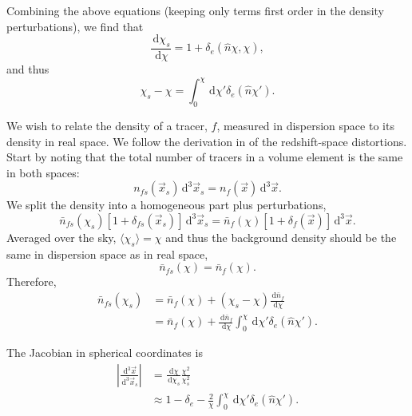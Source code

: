 \documentclass[twocolumn,prl,floatfix]{revtex4-1}
\newcommand{\ud}{\,\mathrm{d}}
\begin{document}
Combining the above equations (keeping only terms first order in the density
perturbations), we find that
\begin{equation}
\frac{\ud \chi_s}{\ud \chi} = 1 + \delta_e(\hat n \chi, \chi),
\end{equation}
and thus
\begin{equation}
\chi_s - \chi = \int_0^\chi \ud \chi' \delta_e(\hat n \chi').
\end{equation}

We wish to relate the density of a tracer, $f$, measured in dispersion space to its
density in real space. We follow the derivation in \citet{1987MNRAS.227....1K}
of the
redshift-space distortions. Start by noting that the total number of tracers
in a volume element is the same in both spaces:
\begin{equation}
n_{fs}(\vec x_s) \ud^3\vec x_s = n_{f}(\vec x) \ud^3\vec x.
\end{equation}
We split the density into a homogeneous part plus perturbations,
\begin{equation}
\label{e:density}
    \bar{n}_{fs}(\chi_s)\left[ 1 + \delta_{fs}(\vec x_s)\right] \ud^3\vec x_s
    = \bar{n}_{f}(\chi)\left[ 1 + \delta_f(\vec x)\right] \ud^3\vec x.
\end{equation}
Averaged over the sky, $\langle \chi_s \rangle = \chi$ and thus the background
density should
be the same in dispersion space as in real space,
\begin{equation}
\bar{n}_{fs}(\chi) = \bar{n}_f(\chi).
\end{equation}
Therefore,
\begin{align}
\bar{n}_{fs}(\chi_s) 
    &= \bar{n}_{f}(\chi) + (\chi_s - \chi)\frac{\ud \bar{n}_f}{\ud \chi}\\
    &= \bar{n}_{f}(\chi)
       + \frac{\ud \bar{n}_f}{\ud \chi}\int_0^\chi \ud \chi' \delta_e(\hat n
       \chi').
       \label{e:nfs}
\end{align}

The Jacobian in spherical coordinates is
\begin{align}
\left| \frac{\ud^3\vec x}{\ud^3\vec x_s} \right|
    &= \frac{\ud \chi}{\ud \chi_s}\frac{\chi^2}{\chi_s^2}\\
    &\approx 1 - \delta_e
        - \frac{2}{\chi}\int_0^\chi \ud \chi' \delta_e(\hat n \chi').
        \label{e:jac}
\end{align}
\end{document}
